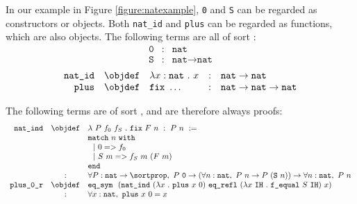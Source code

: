 In our example in Figure \ref{figure:natexample}, \texttt{0} and \texttt{S} can be regarded as constructors or objects.
Both \texttt{nat\_id} and \texttt{plus} can be regarded as functions, which are also objects.
The following terms are all of sort \sortset:
$$
	\begin{array}{rcl}
		\texttt{0} & : & \texttt{nat} \\
		\texttt{S} & : & \texttt{nat} \rightarrow \texttt{nat}
	\end{array}
$$
$$
	\begin{array}{rclcl}
		\texttt{nat\_id} & \objdef & \lambda x : \texttt{nat}~.~x & : & \texttt{nat} \rightarrow \texttt{nat} \\
		\texttt{plus} & \objdef & \texttt{fix}~\ldots & : & \texttt{nat} \rightarrow \texttt{nat} \rightarrow \texttt{nat} \\
	\end{array}
$$

The following terms are of sort \sortprop, and are therefore always proofs:
$$
	\begin{array}{rcl}

		\texttt{nat\_ind} & \objdef & \lambda~P~f_0~f_S ~.~ \texttt{fix}~F~n ~:~ P~n ~:= \\
			&   &  \texttt{match}~ n ~\texttt{with} \\
			&   &  ~~| ~0 => f_0 \\
			&	&  ~~| ~S~m => f_S~m~(F~m) \\
			&	&  \texttt{end} \\
			& : &  \forall P : \texttt{nat} \rightarrow \sortprop,~
				P~\texttt{0} \rightarrow (\forall n : \texttt{nat},~ P~n \rightarrow P~(\texttt{S}~n)) \rightarrow \forall n : \texttt{nat},~ P~n \\


		\texttt{plus\_0\_r} & \objdef & \texttt{eq\_sym}
							~~(\texttt{nat\_ind}~(\lambda x~.~\texttt{plus}~x~0)~\texttt{eq\_refl}~(\lambda x~\texttt{IH}~.~\texttt{f\_equal}~S~\texttt{IH})~x) \\
							& : & \forall x : \texttt{nat},~ \texttt{plus}~x~0 = x \\
	\end{array}
$$

